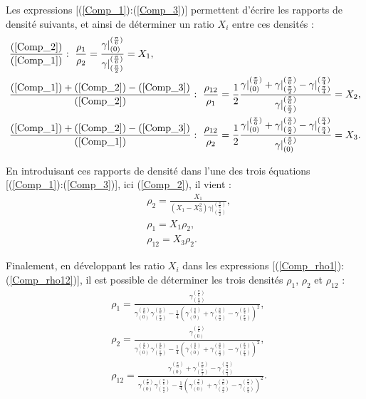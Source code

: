 \documentclass[12pt]{report}
\begin{document}
    Les expressions [(\ref{Comp_1}):(\ref{Comp_3})] permettent d'écrire les rapports de densité suivants, et ainsi de déterminer un ratio $X_i$ entre ces densités :
    \begin{align}
    &\frac{(\ref{Comp_2})}{(\ref{Comp_1})} :\ \frac{\rho_1}{\rho_2}=\frac{\gamma|^{(\frac{\pi}{6})}_{(0)}}{\gamma|^{(\frac{\pi}{6})}_{(\frac{\pi}{2})}}=X_1,\label{Comp_rho2_rho1} \\
    &\frac{(\ref{Comp_1})+(\ref{Comp_2})-(\ref{Comp_3})}{(\ref{Comp_2})} :\ \frac{\rho_{12}}{\rho_1}=\frac{1}{2}\frac{\gamma|^{(\frac{\pi}{6})}_{(0)}+\gamma|^{(\frac{\pi}{6})}_{(\frac{\pi}{2})}-\gamma|^{(\frac{\pi}{4})}_{(\frac{\pi}{4})}}{\gamma|^{(\frac{\pi}{6})}_{(\frac{\pi}{2})}}=X_2,\label{Comp_rho12_rho1} \\
    &\frac{(\ref{Comp_1})+(\ref{Comp_2})-(\ref{Comp_3})}{(\ref{Comp_1})} :\ \frac{\rho_{12}}{\rho_2}=\frac{1}{2}\frac{\gamma|^{(\frac{\pi}{6})}_{(0)}+\gamma|^{(\frac{\pi}{6})}_{(\frac{\pi}{2})}-\gamma|^{(\frac{\pi}{4})}_{(\frac{\pi}{4})}}{\gamma|^{(\frac{\pi}{6})}_{(0)}}=X_3.\label{Comp_rho12_rho2}
    \end{align}
    
    En introduisant ces rapports de densité dans l'une des trois équations [(\ref{Comp_1}):(\ref{Comp_3})], ici (\ref{Comp_2}), il vient : 
    \begin{align}
    &\rho_2=\frac{X_1}{(X_1-X_3^2)\gamma|^{(\frac{\pi}{6})}_{(\frac{\pi}{2})}},\label{Comp_rho2}\\
    &\rho_1=X_1\rho_2,\label{Comp_rho1}\\
    &\rho_{12}=X_3\rho_2.\label{Comp_rho12}
    \end{align}
    
    Finalement, en développant les ratio $X_i$ dans les expressions [(\ref{Comp_rho1}):(\ref{Comp_rho12})], il est possible de déterminer les trois densités $\rho_1$, $\rho_2$ et $\rho_{12}$ :
    \begin{align}
        &\rho_1=\frac{\gamma^{(\frac{\pi}{6})}_{(\frac{\pi}{2})}}{\gamma^{(\frac{\pi}{6})}_{(0)}\gamma^{(\frac{\pi}{6})}_{(\frac{\pi}{2})}-\frac{1}{4}(\gamma^{(\frac{\pi}{6})}_{(0)}+\gamma^{(\frac{\pi}{6})}_{(\frac{\pi}{2})}-\gamma^{(\frac{\pi}{4})}_{(\frac{\pi}{4})})^2},\label{rho1}\\
        &\rho_2=\frac{\gamma^{(\frac{\pi}{6})}_{(0)}}{\gamma^{(\frac{\pi}{6})}_{(0)}\gamma^{(\frac{\pi}{6})}_{(\frac{\pi}{2})}-\frac{1}{4}(\gamma^{(\frac{\pi}{6})}_{(0)}+\gamma^{(\frac{\pi}{6})}_{(\frac{\pi}{2})}-\gamma^{(\frac{\pi}{4})}_{(\frac{\pi}{4})})^2},\label{rho2}\\
        &\rho_{12}=\frac{\gamma^{(\frac{\pi}{6})}_{(0)}+\gamma^{(\frac{\pi}{6})}_{(\frac{\pi}{2})}-\gamma^{(\frac{\pi}{4})}_{(\frac{\pi}{4})}}{\gamma^{(\frac{\pi}{6})}_{(0)}\gamma^{(\frac{\pi}{6})}_{(\frac{\pi}{2})}-\frac{1}{4}(\gamma^{(\frac{\pi}{6})}_{(0)}+\gamma^{(\frac{\pi}{6})}_{(\frac{\pi}{2})}-\gamma^{(\frac{\pi}{4})}_{(\frac{\pi}{4})})^2}.\label{rho12}
    \end{align}
\end{document}
